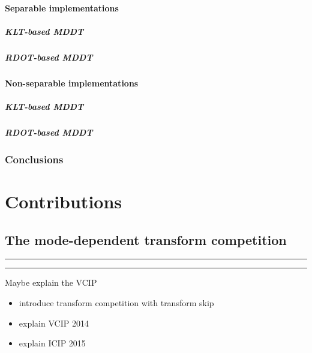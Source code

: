 \documentclass[11pt,a4paper,openright,twoside]{book}
\providecommand{\chaptertoc}{
	\startcontents[chapters]
	\hrule
	\vspace{1em}
	\printcontents[chapters]{}{1}{{\bf\large Contents}}
	\hrule
}
\numberwithin{equation}{section} %
\numberwithin{figure}{section} %
\numberwithin{table}{section} %
\begin{document}
\subsection{Separable implementations}
\label{sub:separable_implementations}


\subsubsection{\ac{KLT}-based \ac{MDDT}}
\label{ssub:sep_klt_based_mddt}
\subsubsection{\ac{RDOT}-based \ac{MDDT}}
\label{ssub:sep_rdot_based_mddt}

\subsection{Non-separable implementations}
\label{sub:non_separable_implementations}

\subsubsection{\ac{KLT}-based \ac{MDDT}}
\label{ssub:nsep_klt_based_mddt}
\subsubsection{\ac{RDOT}-based \ac{MDDT}}
\label{ssub:nsep_rdot_based_mddt}

\section{Conclusions}
\label{sec:conclusions}

\part{Contributions}
\label{prt:contributions}

\chapter{The mode-dependent transform competition}
\label{cha:the_mode_dependent_transform_competition}
\chaptertoc

\vspace{0.5cm}
Maybe explain the VCIP

\begin{itemize}
	\item introduce transform competition with transform
		skip~\cite{JCTVC-F077, JCTVC-H0208}
	\item explain VCIP 2014~\cite{arrufat-14-transform-competition-rdot}
	\item explain ICIP 2015~\cite{arrufat-15-mdtc}
\end{itemize}
\end{document}
